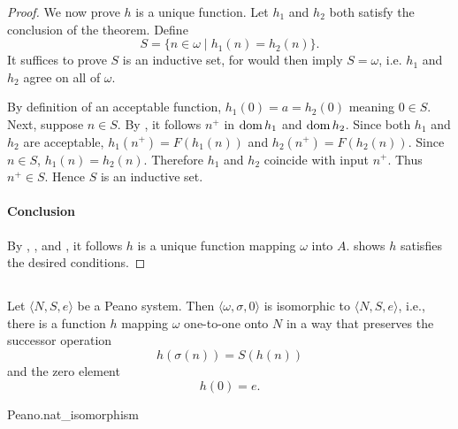 \documentclass{report}
\begin{document}
\begin{proof}
      We now prove $h$ is a unique function.
      Let $h_1$ and $h_2$ both satisfy the conclusion of the theorem.
      Define $$S = \{n \in \omega \mid h_1(n) = h_2(n)\}.$$
      It suffices to prove $S$ is an inductive set, for 
        would then imply $S = \omega$, i.e. $h_1$ and $h_2$ agree on all of
        $\omega$.

      By definition of an acceptable function, $h_1(0) = a = h_2(0)$ meaning
        $0 \in S$.
      Next, suppose $n \in S$.
      By , it follows $n^+$
        in $\mathop{\text{dom}}{h_1}$ and $\mathop{\text{dom}}{h_2}$.
      Since both $h_1$ and $h_2$ are acceptable, $h_1(n^+) = F(h_1(n))$ and
        $h_2(n^+) = F(h_2(n))$.
      Since $n \in S$, $h_1(n) = h_2(n)$.
      Therefore $h_1$ and $h_2$ coincide with input $n^+$.
      Thus $n^+ \in S$.
      Hence $S$ is an inductive set.

    \paragraph{Conclusion}%

      By ,
        , and
        , it follows $h$ is a
        unique function mapping $\omega$ into $A$.
       shows $h$ satisfies the
        desired conditions.

  \end{proof}

\subsection{}%

  \begin{theorem}[4H]
    Let $\langle N, S, e \rangle$ be a Peano system.
    Then $\langle \omega, \sigma, 0 \rangle$ is isomorphic to
      $\langle N, S, e \rangle$, i.e., there is a function $h$ mapping $\omega$
      one-to-one onto $N$ in a way that preserves the successor operation
      $$h(\sigma(n)) = S(h(n))$$ and the zero element $$h(0) = e.$$
  \end{theorem}

    {Peano.nat\_isomorphism}
\end{document}
